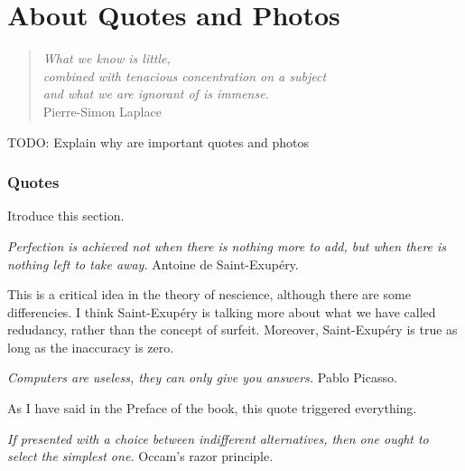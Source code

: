 %
%


\chapter{About Quotes and Photos}
\label{apx:photos}

\begin{quote}
\begin{flushright}
\emph{What we know is little, \\
combined with tenacious concentration on a subject\\
and what we are ignorant of is immense.}\\
Pierre-Simon Laplace
\end{flushright}
\end{quote}
\bigskip

{\color{red} TODO: Explain why are important quotes and photos}

\subsection{Quotes}

{\color{red} Itroduce this section.}

\bigskip

\emph{Perfection is achieved not when there is nothing more to add, but when there is nothing left to take away.} Antoine de Saint-Exupéry.

{\color{red} This is a critical idea in the theory of nescience, although there are some differencies. I think Saint-Exupéry is talking more about what we have called redudancy, rather than the concept of surfeit. Moreover, Saint-Exupéry is true as long as the inaccuracy is zero.}

\bigskip

\emph{Computers are useless, they can only give you answers.} Pablo Picasso.

{\color{red} As I have said in the Preface of the book, this quote triggered everything.}

\bigskip

\emph{If presented with a choice between indifferent alternatives, then one ought to select the simplest one.} Occam’s razor principle.

